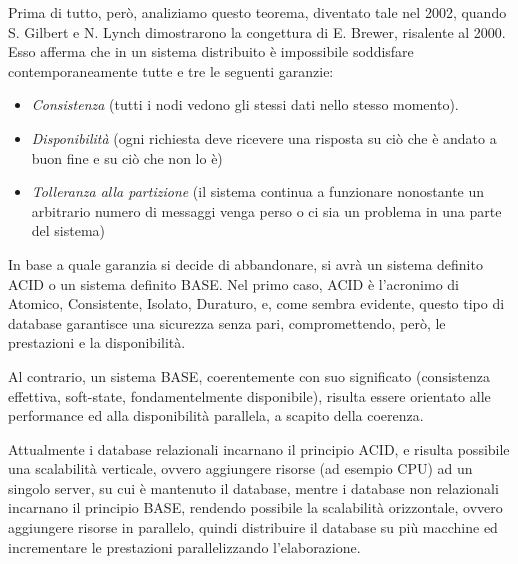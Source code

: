 Prima di tutto, però, analiziamo questo teorema, diventato tale nel 2002, quando S. Gilbert e N. Lynch dimostrarono la congettura di E. Brewer, risalente al 2000. Esso afferma che in un sistema distribuito è impossibile soddisfare contemporaneamente tutte e tre le seguenti garanzie:
\begin{itemize}
\item \emph{Consistenza} (tutti i nodi vedono gli stessi dati nello stesso momento).
\item \emph{Disponibilità} (ogni richiesta deve ricevere una risposta su ciò che è andato a buon fine e su ciò che non lo è)
\item \emph{Tolleranza alla partizione} (il sistema continua a funzionare nonostante un arbitrario numero di messaggi venga perso o ci sia un problema in una parte del sistema)
\end{itemize}

In base a quale garanzia si decide di abbandonare, si avrà un sistema definito ACID o un sistema definito BASE. Nel primo caso, ACID è l'acronimo di Atomico, Consistente, Isolato, Duraturo, e, come sembra evidente, questo tipo di database garantisce una sicurezza senza pari, compromettendo, però, le prestazioni e la disponibilità.

Al contrario, un sistema BASE, coerentemente con suo significato (consistenza effettiva, soft-state, fondamentelmente disponibile), risulta essere orientato alle performance ed alla disponibilità parallela, a scapito della coerenza.

Attualmente i database relazionali incarnano il principio ACID, e risulta possibile una scalabilità verticale, ovvero aggiungere risorse (ad esempio CPU) ad un singolo server, su cui è mantenuto il database, mentre i database non relazionali incarnano il principio BASE, rendendo possibile la scalabilità orizzontale, ovvero aggiungere risorse in parallelo, quindi distribuire il database su più macchine ed incrementare le prestazioni parallelizzando l'elaborazione.

